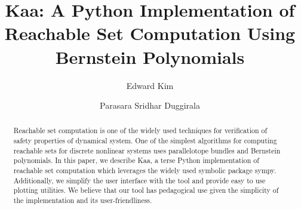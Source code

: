 \documentclass[EPiC]{easychair}
\begin{document}
%
\title{Kaa: A Python Implementation of Reachable Set Computation Using Bernstein Polynomials}
%
%
\author{Edward Kim
\and
Parasara Sridhar Duggirala
}
%
%
%
\maketitle              %
%
\begin{abstract}
Reachable set computation is one of the widely used techniques for verification of safety properties of dynamical system. 
%
One of the simplest algorithms for computing reachable sets for discrete nonlinear systems uses parallelotope bundles and Bernstein polynomials.
%
In this paper, we describe Kaa, a terse Python implementation of reachable set computation which leverages the widely used symbolic package sympy.
%
Additionally, we simplify the user interface with the tool and provide easy to use plotting utilities.
%
%
We believe that our tool has pedagogical use given the simplicity of the implementation and its user-friendliness.
%
\end{abstract}

\end{document}

